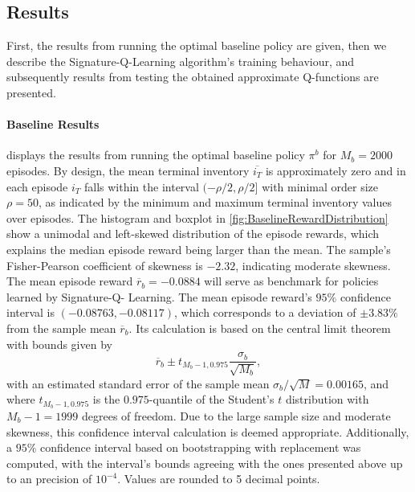 \documentclass[
    a4paper,
    11pt,
    bibliography=totoc,
    listof=totoc,      
    headinclude=true,
    cleardoublepage=empty,
]{scrbook}
\theoremstyle{plain}
\theoremstyle{definition}
\theoremstyle{remark}
\begin{document}
\subsection{Results}
\label{chapter:Experiments:section:Execution:sub:Results}

First, the results from running the optimal baseline policy are given, then  
we describe the Signature-Q-Learning algorithm's training behaviour, and 
subsequently results from testing the obtained approximate Q-functions are 
presented.

\paragraph{Baseline Results}

 displays the results from running the 
optimal baseline policy $\pi^b$ for $M_b=2000$ episodes. By design, the mean 
terminal inventory $\overline{i_T}$ is approximately zero and in each episode 
$i_T$ falls within the interval $(-\rho/2, \rho/2]$ with minimal order size
$\rho=50$, as indicated by the minimum and maximum terminal inventory values 
over episodes. The histogram and boxplot in 
\cref{fig:BaselineRewardDistribution} show a unimodal and left-skewed 
distribution of the episode rewards, which explains the median episode reward 
being larger than the mean. The sample's Fisher-Pearson coefficient of skewness 
is $-2.32$, indicating moderate skewness. The mean episode reward $\overline 
r_b = -0.0884$ will serve as benchmark for policies learned by Signature-Q-%
Learning. The mean episode reward's $95\%$ confidence interval is $(-0.08763, 
-0.08117)$, which corresponds to a deviation of $\pm 3.83\%$ from the sample 
mean $\overline r_b$. Its calculation is based on the central limit theorem 
with bounds given by
\[
    \overline r_b \pm t_{M_b-1, 0.975} \frac{\sigma_b}{\sqrt{M_b}},
\]
with an estimated standard error of the sample mean $\sigma_b/\sqrt{M} = 
0.00165$, and where $t_{M_b-1,0.975}$ is the $0.975$-quantile of the Student's 
$t$ distribution with $M_b-1=1999$ degrees of freedom. Due to the large sample 
size and moderate skewness, this confidence interval calculation is deemed 
appropriate. Additionally, a $95\%$ confidence interval based on bootstrapping 
with replacement was computed, with the interval's bounds agreeing with the 
ones presented above up to an precision of $10^{-4}$. Values are rounded to 5 
decimal points.
\end{document}
